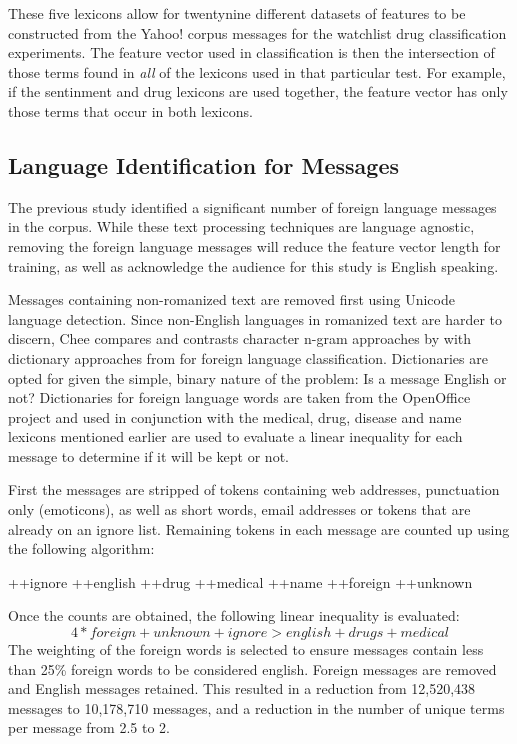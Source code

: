 \documentclass[twoside,11pt]{article}
\begin{document}
These five lexicons allow for twentynine different datasets of features to be constructed from the Yahoo! corpus messages for the watchlist drug classification experiments. The feature vector used in classification is then the intersection of those terms found in \textit{all} of the lexicons used in that particular test. For example, if the sentinment and drug lexicons are used together, the feature vector has only those terms that occur in both lexicons.


\subsection{Language Identification for Messages}
The previous study identified a significant number of foreign language messages in the corpus. While these text processing techniques are language agnostic, removing the foreign language messages will reduce the feature vector length for training, as well as acknowledge the audience for this study is English speaking.

Messages containing non-romanized text are removed first using Unicode language detection. Since non-English languages in romanized text are harder to discern, Chee compares and contrasts character n-gram approaches by \citep{Dunning, 1994} with dictionary approaches from \citep{Rehurek and Kolkus} for foreign language classification. Dictionaries are opted for given the simple, binary nature of the problem: Is a message English or not? Dictionaries for foreign language words are taken from the OpenOffice project and used in conjunction with the medical, drug, disease and name lexicons mentioned earlier are used to evaluate a linear inequality for each message to determine if it will be kept or not.

First the messages are stripped of tokens containing web addresses, punctuation only (emoticons), as well as short words, email addresses or tokens that are already on an ignore list. Remaining tokens in each message are counted up using the following algorithm:
\begin{algorithmic}
    \STATE ++ignore
    \STATE ++english
    \STATE ++drug
    \STATE ++medical
    \STATE ++name
    \STATE ++foreign
  \ELSE
    \STATE ++unknown
  \ENDIF
\end{algorithmic}
Once the counts are obtained, the following linear inequality is evaluated:
\[
  4 * foreign + unknown + ignore > english + drugs + medical
\]
The weighting of the foreign words is selected to ensure messages contain less than 25\% foreign words to be considered english. Foreign messages are removed and English messages retained.  This resulted in a reduction from 12,520,438 messages to 10,178,710 messages, and a reduction in the number of unique terms per message from 2.5 to 2.
\end{document}
